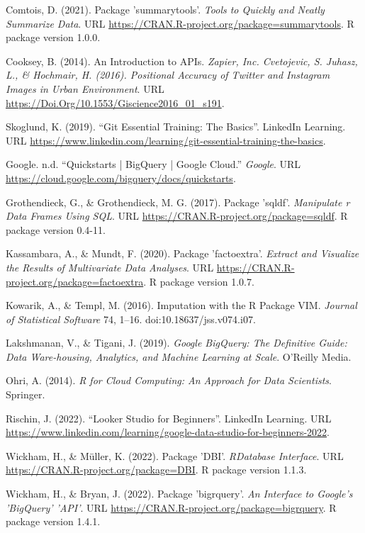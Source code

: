 \documentclass[12pt,longbibliography]{article}
\theoremstyle{definition}
\theoremstyle{remark}
\begin{document}
\begin{thebibliography}{99} 


 Comtois, D. (2021). Package 'summarytools'. \textit{Tools to Quickly and Neatly Summarize Data}. URL \url{https://CRAN.R-project.org/package=summarytools}. R package version 1.0.0. 

 Cooksey, B. (2014). An Introduction to APIs. \textit{Zapier, Inc. Cvetojevic, S. Juhasz, L., \& Hochmair, H. (2016). Positional Accuracy of Twitter and Instagram Images in Urban Environment}. URL \url{https://Doi.Org/10.1553/Giscience2016_01_s191}.

 Skoglund, K. (2019). ``Git Essential Training: The Basics''.  LinkedIn Learning. URL \url{https://www.linkedin.com/learning/git-essential-training-the-basics}.

 Google. n.d. ``Quickstarts | BigQuery | Google Cloud.'' \textit{Google}. URL \url{https://cloud.google.com/bigquery/docs/quickstarts}.

 Grothendieck, G., \& Grothendieck, M. G. (2017). Package 'sqldf'. \textit{Manipulate r Data Frames Using SQL}. URL \url{https://CRAN.R-project.org/package=sqldf}. R package version 0.4-11.

 Kassambara, A., \& Mundt, F. (2020). Package 'factoextra'. \textit{Extract and Visualize the Results of Multivariate Data Analyses}. URL \url{https://CRAN.R-project.org/package=factoextra}. R package version 1.0.7. 

 Kowarik, A., \& Templ, M. (2016). Imputation with the R Package VIM. \textit{Journal of Statistical Software} 74, 1–16. doi:10.18637/jss.v074.i07. 

 Lakshmanan, V., \& Tigani, J. (2019). \textit{Google BigQuery: The Definitive Guide: Data Ware-housing, Analytics, and Machine Learning at Scale}. O’Reilly Media.

 Ohri, A. (2014). \textit{R for Cloud Computing: An Approach for Data Scientists}. Springer.

 Rischin, J. (2022). ``Looker Studio for Beginners''. LinkedIn Learning. URL \url{https://www.linkedin.com/learning/google-data-studio-for-beginners-2022}.

 Wickham, H., \& Müller, K. (2022). Package 'DBI'. \textit{RDatabase Interface}. URL \url{https://CRAN.R-project.org/package=DBI}. R package version 1.1.3. 

 Wickham, H., \& Bryan, J. (2022). Package 'bigrquery'. \textit{An Interface to Google’s ’BigQuery’ ’API’}. URL \url{https://CRAN.R-project.org/package=bigrquery}. R package version 1.4.1.


\end{thebibliography}
\end{document}
